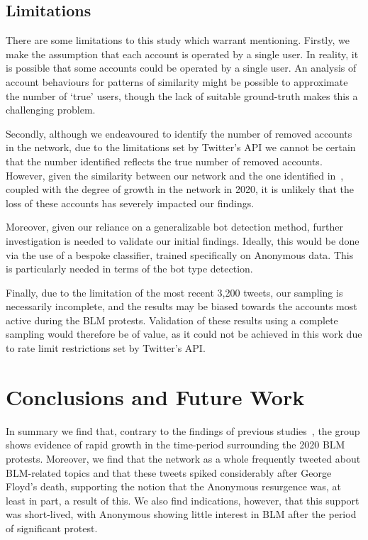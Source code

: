 \documentclass[letterpaper]{article}
\begin{document}
\vspace{-1.44mm}
\subsection{Limitations}

There are some limitations to this study which warrant mentioning. Firstly, we make the assumption that each account is operated by a single user. In reality, it is possible that some accounts could be operated by a single user. An analysis of account behaviours for patterns of similarity might be possible to approximate the number of `true' users, though the lack of suitable ground-truth makes this a challenging problem.

Secondly, although we endeavoured to identify the number of removed accounts in the network, due to the limitations set by Twitter's API we cannot be certain that the number identified reflects the true number of removed accounts. However, given the similarity between our network and the one identified in~\cite{Jones2020}, coupled with the degree of growth in the network in 2020, it is unlikely that the loss of these accounts has severely impacted our findings.

Moreover, given our reliance on a generalizable bot detection method, further investigation is needed to validate our initial findings. Ideally, this would be done via the use of a bespoke classifier, trained specifically on Anonymous data. This is particularly needed in terms of the bot type detection.

Finally, due to the limitation of the most recent 3,200 tweets, our sampling is necessarily incomplete, and the results may be biased towards the accounts most active during the BLM protests. Validation of these results using a complete sampling would therefore be of value, as it could not be achieved in this work due to rate limit restrictions set by Twitter's API.

\vspace{-0.99mm}
\section{Conclusions and Future Work}

In summary we find that, contrary to the findings of previous studies~\cite{Jones2020,Uitermark2017}, the group shows evidence of rapid growth in the time-period surrounding the 2020 BLM protests. Moreover, we find that the network as a whole frequently tweeted about BLM-related topics and that these tweets spiked considerably after George Floyd's death, supporting the notion that the Anonymous resurgence was, at least in part, a result of this. We also find indications, however, that this support was short-lived, with Anonymous showing little interest in BLM after the period of significant protest.
\end{document}
